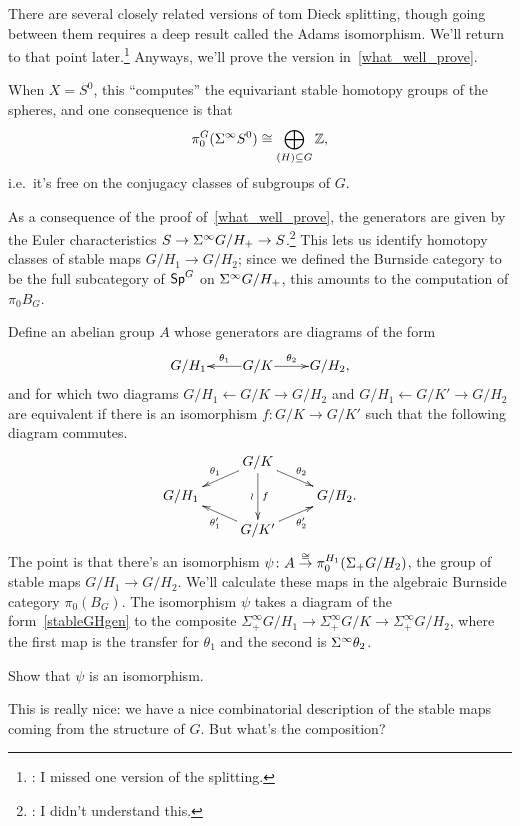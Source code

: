 There are several closely related versions of tom Dieck splitting, though going between them requires a deep result
called the Adams isomorphism. We'll return to that point later.\footnote{\TODO: I missed one version of the
splitting.} Anyways, we'll prove the version in~\eqref{what_well_prove}.

When $X = S^0$, this ``computes'' the equivariant stable homotopy groups of the spheres, and one consequence is
that
\begin{equation}
\label{piGs0}
\pi^G_0(\Sigma^\infty S^0) \cong \bigoplus_{(H)\subseteq G} \mathbb Z,
\end{equation}
i.e.\ it's free on the conjugacy classes of subgroups of $G$.

As a consequence of the proof of~\eqref{what_well_prove}, the generators are given by the Euler characteristics
$S\to \Sigma^\infty G/H_+\to S$.\footnote{\TODO: I didn't understand this.} This lets us identify homotopy classes
of stable maps $G/H_1\to G/H_2$; since we defined the Burnside category to be the full subcategory of $\mathsf{Sp}^G$ on
$\Sigma^\infty G/H_+$, this amounts to the computation of $\pi_0 B_G$.

Define an abelian group $A$ whose generators are diagrams of the form
\begin{equation}
\label{stableGHgen}
\xymatrix@1{
	G/H_1 & G/K\ar[l]_-{\theta_1}\ar[r]^-{\theta_2} & G/H_2,
}
\end{equation}
and for which two diagrams $G/H_1\gets G/K\to G/H_2$ and $G/H_1\gets G/K'\to G/H_2$ are equivalent if there is an
isomorphism $f\colon G/K\to G/K'$ such that the following diagram commutes.
\[\xymatrix@R=0.3cm{
	& G/K\ar[dd]_\wr^f\ar[dr]^{\theta_2}\ar[dl]_{\theta_1}\\
	G/H_1 && G/H_2.\\
	& G/K'\ar[ul]^{\theta_1'}\ar[ur]_{\theta_2'}
}\]
The point is that there's an isomorphism $\psi\colon A\stackrel\cong\to\pi_0^{H_1}(\Sigma_+ G/H_2)$, the group of stable maps
$G/H_1\to G/H_2$. We'll calculate these maps in the algebraic Burnside category $\pi_0(B_G)$. The isomorphism
$\psi$ takes a diagram of the form~\eqref{stableGHgen} to the composite $\Sigma_+^\infty G/H_1\to \Sigma_+^\infty
G/K\to\Sigma_+^\infty G/H_2$, where the first map is the transfer for $\theta_1$ and the second is
$\Sigma^\infty\theta_2$.
\begin{ex}
Show that $\psi$ is an isomorphism.
\end{ex}
This is really nice: we have a nice combinatorial description of the stable maps coming from the structure of $G$.
But what's the composition?

